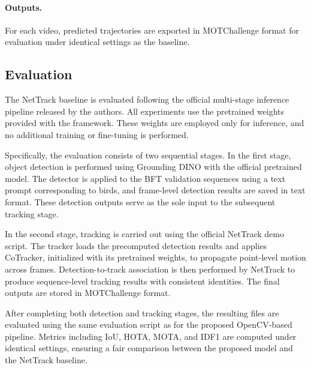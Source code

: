 \paragraph{Outputs.}
For each video, predicted trajectories are exported in MOTChallenge format for evaluation under identical settings as the baseline.


\subsection{Evaluation}

The NetTrack baseline is evaluated following the official multi-stage inference pipeline released by the authors. All experiments use the pretrained weights provided with the framework. These weights are employed only for inference, and no additional training or fine-tuning is performed.

Specifically, the evaluation consists of two sequential stages. In the first stage, object detection is performed using Grounding DINO with the official pretrained model. The detector is applied to the BFT validation sequences using a text prompt corresponding to birds, and frame-level detection results are saved in text format. These detection outputs serve as the sole input to the subsequent tracking stage.

In the second stage, tracking is carried out using the official NetTrack demo script. The tracker loads the precomputed detection results and applies CoTracker, initialized with its pretrained weights, to propagate point-level motion across frames. Detection-to-track association is then performed by NetTrack to produce sequence-level tracking results with consistent identities. The final outputs are stored in MOTChallenge format.

After completing both detection and tracking stages, the resulting files are evaluated using the same evaluation script as for the proposed OpenCV-based pipeline. Metrics including IoU, HOTA, MOTA, and IDF1 are computed under identical settings, ensuring a fair comparison between the proposed model and the NetTrack baseline.